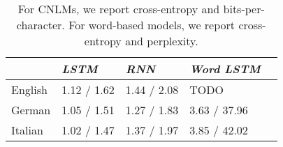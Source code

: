 \begin{table}[t]
  \begin{center}
    \begin{tabular}{l|l|l|l|l}
      \multicolumn{1}{c}{}&\emph{LSTM}&\emph{RNN}&\emph{Word LSTM}\\
      \hline
	    English & 1.12 / 1.62 & 1.44 / 2.08 & TODO  \\
	    German &  1.05 / 1.51 & 1.27 / 1.83 & 3.63 / 37.96   \\
	    Italian & 1.02 / 1.47 & 1.37 / 1.97 & 3.85 / 42.02  \\
    \end{tabular}
  \end{center}
  \caption{\label{tab:lm-results} For CNLMs, we report cross-entropy and bits-per-character. For word-based models, we report cross-entropy and perplexity.}
\end{table}




